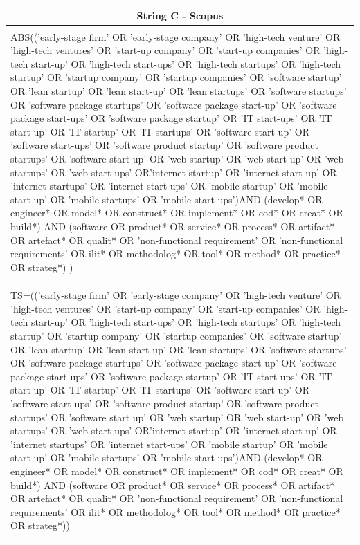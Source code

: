 \documentclass[final,5p,times,twocolumn]{elsarticle}
\begin{document}
\begin{longtable}{|p{5.3in}|}
\multicolumn{1}{|c|}{String C - Scopus \cite{scopus}} \\
\hline
\hspace{1in}\\
ABS(('early-stage firm' OR 'early-stage company' OR 'high-tech venture' OR 'high-tech ventures' OR 'start-up company' OR 'start-up companies' OR 'high-tech start-up' OR 'high-tech start-ups' OR 'high-tech startups' OR 'high-tech startup' OR 'startup company' OR 'startup companies' OR 'software startup' OR 'lean startup' OR 'lean start-up' OR 'lean startups' OR 'software startups' OR 'software package startups' OR 'software package start-up' OR 'software package start-ups' OR 'software package startup' OR 'IT start-ups' OR 'IT start-up' OR 'IT startup' OR 'IT startups' OR 'software start-up' OR 'software start-ups' OR 'software product startup' OR 'software product startups' OR 'software start up' OR 'web startup' OR 'web start-up' OR 'web startups' OR 'web start-ups' OR'internet startup' OR 'internet start-up' OR 'internet startups' OR 'internet start-ups' OR 'mobile startup' OR 'mobile start-up' OR 'mobile startups' OR 'mobile start-ups')AND (develop* OR engineer* OR model* OR construct* OR implement* OR cod* OR creat* OR build*) AND (software OR product* OR service* OR process* OR artifact* OR artefact*  OR qualit* OR 'non-functional requirement' OR 'non-functional requirements' OR ilit* OR methodolog* OR tool* OR method* OR practice* OR strateg*) ) \\
\hspace{3in}\\
\hline  \hline
\pagebreak
\multicolumn{1}{|c|}{String D - ISI Web of Knowledge \cite{ISIweb}} \\
\hline   
\hspace{1in}\\
TS=(('early-stage firm' OR 'early-stage company' OR 'high-tech venture' OR 'high-tech ventures' OR 'start-up company' OR 'start-up companies' OR 'high-tech start-up' OR 'high-tech start-ups' OR 'high-tech startups' OR 'high-tech startup' OR 'startup company' OR 'startup companies' OR 'software startup' OR 'lean startup' OR 'lean start-up' OR 'lean startups' OR 'software startups' OR 'software package startups' OR 'software package start-up' OR 'software package start-ups' OR 'software package startup' OR 'IT start-ups' OR 'IT start-up' OR 'IT startup' OR 'IT startups' OR 'software start-up' OR 'software start-ups' OR 'software product startup' OR 'software product startups' OR 'software start up' OR 'web startup' OR 'web start-up' OR 'web startups' OR 'web start-ups' OR'internet startup' OR 'internet start-up' OR 'internet startups' OR 'internet start-ups' OR 'mobile startup' OR 'mobile start-up' OR 'mobile startups' OR 'mobile start-ups')AND (develop* OR engineer* OR model* OR construct* OR implement* OR cod* OR creat* OR build*) AND (software OR product* OR service* OR process* OR artifact* OR artefact*  OR qualit* OR 'non-functional requirement' OR 'non-functional requirements' OR ilit* OR methodolog* OR tool* OR method* OR practice* OR strateg*))   \\
\hspace{1in}\\
\hline  \hline


\end{longtable}
\end{document}
